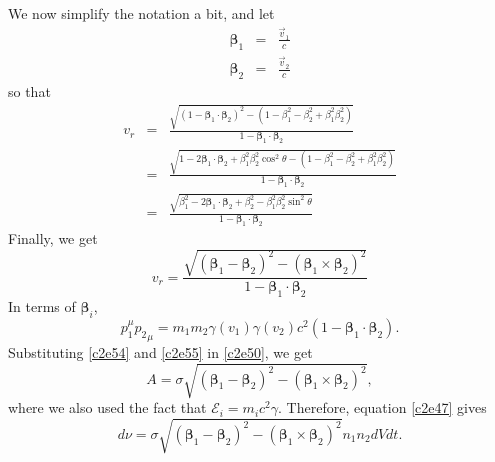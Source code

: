 \begin{enumerate}
We now simplify the notation a bit, and let
\begin{eqnarray}
\bm{\beta}_1 &=& \frac{\vec{v}_1}{c} \label{c2e52} \\
\bm{\beta}_2 &=& \frac{\vec{v}_2}{c} \label{c2e53}
\end{eqnarray}
so that
\begin{eqnarray*}
v_r &=& \frac{\sqrt{(1 - \bm{\beta}_1\cdot\bm{\beta}_2)^2 - (1 - \beta_1^2 - \beta_2^2 + \beta_1^2\beta_2^2)}}
{1 - \bm{\beta}_1\cdot\bm{\beta}_2} \\
 &=& \frac{\sqrt{1 - 2\bm{\beta}_1\cdot\bm{\beta}_2 + \beta_1^2\beta_2^2\cos^2\theta - 
 (1 - \beta_1^2 - \beta_2^2 + \beta_1^2\beta_2^2)}}{1 - \bm{\beta}_1\cdot\bm{\beta}_2} \\
 &=& \frac{\sqrt{\beta_1^2 - 2\bm{\beta}_1\cdot\bm{\beta}_2 + \beta_2^2 - \beta_1^2\beta_2^2\sin^2\theta }}
 {1 - \bm{\beta}_1\cdot\bm{\beta}_2}
\end{eqnarray*}
Finally, we get
\begin{equation}\label{c2e54}
v_r = \frac{\sqrt{(\bm{\beta}_1 - \bm{\beta}_2)^2 - (\bm{\beta}_1 \times \bm{\beta}_2)^2}}
  {1 - \bm{\beta}_1\cdot\bm{\beta}_2}
\end{equation}
In terms of $\bm{\beta}_i$,
\begin{equation}\label{c2e55}
p_1^\mu {p_2}_\mu = m_1m_2\gamma(v_1)\gamma(v_2)c^2\left(1 - \bm{\beta}_1\cdot\bm{\beta}_2\right).
\end{equation}
Substituting \eqref{c2e54} and \eqref{c2e55} in \eqref{c2e50}, we get
\begin{equation}\label{c2e56}
A = \sigma \sqrt{(\bm{\beta}_1 - \bm{\beta}_2)^2 - (\bm{\beta}_1 \times \bm{\beta}_2)^2},
\end{equation}
where we also used the fact that $\mathcal{E}_i = m_ic^2\gamma$. Therefore, equation \eqref{c2e47} gives
\begin{equation}\label{c2e57}
d\nu = \sigma \sqrt{(\bm{\beta}_1 - \bm{\beta}_2)^2 - (\bm{\beta}_1 \times \bm{\beta}_2)^2}
	n_1n_2dVdt.
\end{equation}


\end{enumerate}
